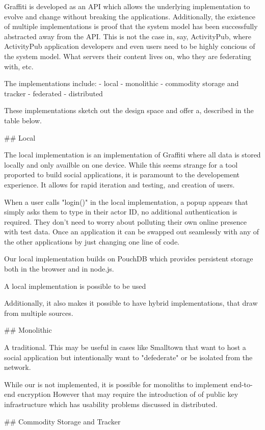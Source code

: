 Graffiti is developed as an API which allows the underlying implementation
to evolve and change without breaking the applications.
Additionally, the existence of multiple implementations is proof that
the system model has been successfully abstracted away from the API.
This is not the case in, say, ActivityPub, where ActivityPub application developers
and even users need to be highly concious of the system model.
What servers their content lives on, who they are federating with, etc.

The implementations include:
- local
- monolithic
- commodity storage and tracker
- federated
- distributed

These implementations sketch out the design space and offer a,
described in the table below.

## Local

The local implementation is an implementation of Graffiti where all data is stored
locally and only availble on one device. While this seems strange for a tool
proported to build social applications, it is paramount to the developement experience.
It allows for rapid iteration and testing, and creation of users.

When a user calls "login()" in the local implementation, a popup appears that
simply asks them to type in their actor ID, no additional authentication is required.
They don't need to worry about polluting their own online presence with test data.
Once an application it can be swapped out seamlessly with any of the other applications
by just changing one line of code.

Our local implementation builds on PouchDB which provides persistent
storage both in the browser and in node.js.

A local implementation is possible to be used

Additionally, it also makes it possible to have hybrid implementations,
that draw from multiple sources.

## Monolithic

A traditional.
This may be useful in cases like Smalltown that want to host a social application but
intentionally want to "defederate" or be isolated from the network.

While our is not implemented, it is possible for monoliths to implement end-to-end encryption
However that may require the introduction of of public key infrastructure
which has usability problems discussed in distributed.

## Commodity Storage and Tracker

